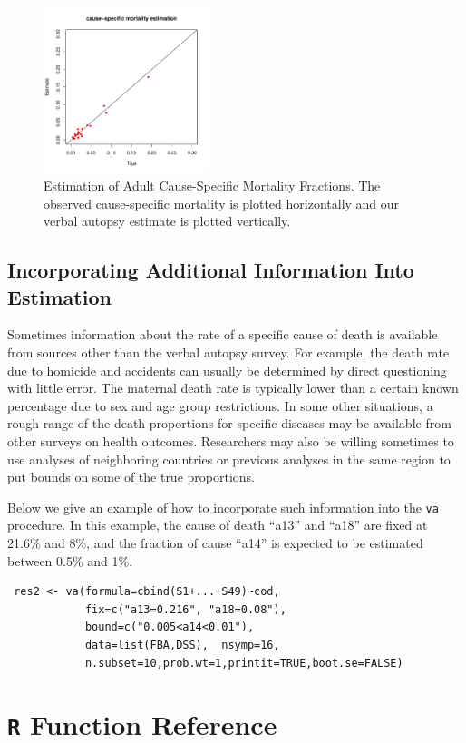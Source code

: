 \documentclass[oneside,letterpaper,titlepage]{article}
\begin{document}
 \begin{figure}[h]
  \centering
  \includegraphics[height=1.9in]{fig1}
  \caption{Estimation of Adult Cause-Specific Mortality Fractions. 
    The observed cause-specific mortality is plotted horizontally and
    our verbal autopsy estimate is plotted vertically.}
  \label{fig1}
\end{figure}

\subsection{Incorporating Additional Information Into Estimation}

Sometimes information about the rate of a specific cause of death is
available from sources other than the verbal autopsy survey.  For
example, the death rate due to homicide and accidents can usually be
determined by direct questioning with little error.  The maternal
death rate is typically lower than a certain known percentage due to
sex and age group restrictions.  In some other situations, a rough
range of the death proportions for specific diseases may be available
from other surveys on health outcomes.  Researchers may also be
willing sometimes to use analyses of neighboring countries or previous
analyses in the same region to put bounds on some of the true
proportions.

Below we give an example of how to incorporate such information into
the \texttt{va} procedure.  In this example, the cause of death
``a13'' and ``a18'' are fixed at 21.6\% and 8\%, and the fraction of
cause ``a14'' is expected to be estimated between 0.5\% and 1\%.
\begin{verbatim}
 res2 <- va(formula=cbind(S1+...+S49)~cod, 
            fix=c("a13=0.216", "a18=0.08"),
            bound=c("0.005<a14<0.01"),
            data=list(FBA,DSS),  nsymp=16,
            n.subset=10,prob.wt=1,printit=TRUE,boot.se=FALSE)
\end{verbatim}



\section{\texttt{R} Function Reference}
\end{document}
